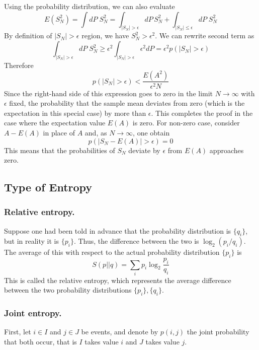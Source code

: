 \documentclass[../../../main.tex]{subfiles}
\begin{document}
Using the probability distribution, we can also evaluate
\begin{equation*}
  E(S_N^2) =\int dP\;S_N^2=\int_{|S_N|>\epsilon} dP\,S_N^2+\int_{|S_N|\le\epsilon} dP\;S_N^2
\end{equation*}
By definition of $|S_N| > \epsilon$ region, we have $S_N^2 > \epsilon^2$.
We can rewrite second term as 
\begin{equation*}
  \int_{|S_N|>\epsilon} dP\;S_N^{2} \ge \epsilon ^{2}\int_{|S_N|>\epsilon} \epsilon^{2}dP = \epsilon ^2 p(|S_N|>\epsilon)
\end{equation*}
Therefore
\begin{equation*}
 p(|S_N|>\epsilon) < \frac{E(A^2)}{\epsilon^2 N}
\end{equation*}
Since the right-hand side of this expression goes to zero in the limit $N \rightarrow \infty$ with $\epsilon$ fixed, the probability that the sample mean deviates from zero (which is the expectation in this special case) by more than $\epsilon$.
This completes the proof in the case where the expectation value $E(A)$ is zero.
For non-zero case, consider $A-E(A)$ in place of $A$ and, as $N \rightarrow \infty$, one obtain
\begin{equation*}
 p(|S_N-E(A)|>\epsilon) =0
\end{equation*}
This means that the probabilities of $S_N$ deviate by $\epsilon$ from $E(A)$ approaches zero.

\subsection{Type of Entropy}
\subsubsection{Relative entropy.}
Suppose one had been told in advance that the probability distribution is \( \{q_i\} \), but in reality it is \( \{p_i\} \). 
Thus, the difference between the two is \( \log_2 (p_i/q_i) \). 
The average of this with respect to the actual probability distribution \( \{p_i\} \) is
\begin{equation*}
  S(p||q) = \sum_i p_i \log_2 \frac{p_i}{q_i}
\end{equation*}
This is called the relative entropy, which represents the average difference between the two probability distributions $\{p_i\}, \{q_i\} $. 
\subsubsection{Joint entropy.}
First, let $i \in I$ and $j \in J$ be events, and denote by $p(i,j)$ the joint probability that both occur, that is $I$ takes value $i$ and $J$ takes value $j$. 
\end{document}
